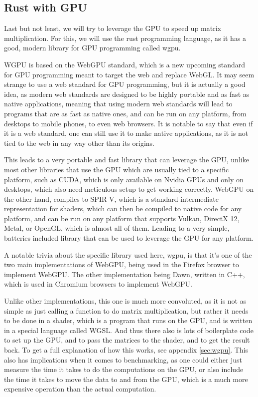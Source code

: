 \documentclass{article}
\begin{document}
\subsection{Rust with GPU}

Last but not least, we will try to leverage the GPU to speed up matrix multiplication.
For this, we will use the rust programming language, as it has a good, modern library for GPU programming called wgpu.

WGPU is based on the WebGPU standard, which is a new upcoming standard for GPU programming meant to target the web and replace WebGL.
It may seem strange to use a web standard for GPU programming, but it is actually a good idea, as modern web standards are designed to be
highly portable and as fast as native applications, meaning that using modern web standards will lead to programs that are as fast as native ones,
and can be run on any platform, from desktops to mobile phones, to even web browsers.
It is notable to say that even if it is a web standard, one can still use it to make native applications, as it is not tied to the web in any way
other than its origins.

This leads to a very portable and fast library that can leverage the GPU, unlike most other libraries that use the GPU which
are usually tied to a specific platform, such as CUDA, which is only available on Nvidia GPUs and only on desktops, which also need meticulous setup
to get working correctly. WebGPU on the other hand, compiles to SPIR-V, which is a standard intermediate representation for shaders, which can then be
compiled to native code for any platform, and can be run on any platform that supports Vulkan, DirectX 12, Metal, or OpenGL, which is almost all of them.
Leading to a very simple, batteries included library that can be used to leverage the GPU for any platform.

A notable trivia about the specific library used here, wgpu, is that it's one of the two main implementations of WebGPU, being used in the Firefox browser to implement WebGPU.
The other implementation being Dawn, written in C++, which is used in Chromium browsers to implement WebGPU.

Unlike other implementations, this one is much more convoluted, as it is not as simple as just calling a function to do matrix multiplication,
but rather it needs to be done in a shader, which is a program that runs on the GPU, and is written in a special language called WGSL.
And thus there also is lots of boilerplate code to set up the GPU, and to pass the matrices to the shader, and to get the result back.
To get a full explanation of how this works, see appendix \ref{sec:wgpu}.
This also has implications when it comes to benchmarking, as one could either just measure the time it takes to do the computations on the GPU,
or also include the time it takes to move the data to and from the GPU, which is a much more expensive operation than the actual computation.
\end{document}
